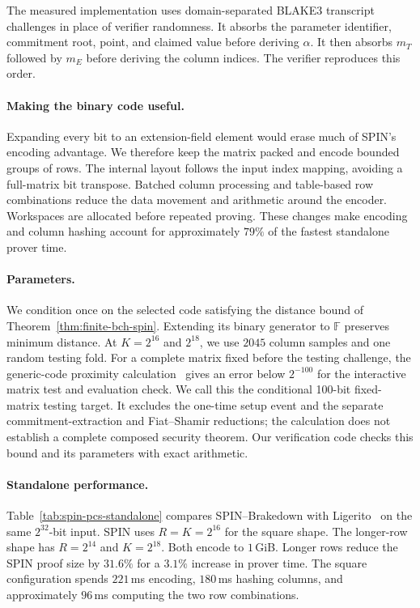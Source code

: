 The measured implementation uses domain-separated BLAKE3 transcript
challenges in place of verifier randomness. It absorbs the parameter
identifier, commitment root, point, and claimed value before deriving
$\alpha$. It then absorbs $m_T$ followed by $m_E$ before deriving the
column indices. The verifier reproduces this order.

\paragraph{Making the binary code useful.}
Expanding every bit to an extension-field element would erase much of
SPIN's encoding advantage. We therefore keep the matrix packed and
encode bounded groups of rows. The internal layout follows the input
index mapping, avoiding a full-matrix bit transpose. Batched column
processing and table-based row combinations reduce the data movement
and arithmetic around the encoder. Workspaces are allocated before
repeated proving. These changes make encoding and column hashing account
for approximately $79\%$ of the fastest standalone prover time.

\paragraph{Parameters.}
We condition once on the selected code satisfying the distance bound
of Theorem~\ref{thm:finite-bch-spin}. Extending its binary generator to
$\mathbb F$ preserves minimum distance. At $K=2^{16}$ and $2^{18}$,
we use $2045$ column samples and one random testing fold. For a complete
matrix fixed before the testing challenge, the generic-code proximity
calculation~\cite{diamondPosen24} gives an error below $2^{-100}$ for the
interactive matrix test and evaluation check. We call this
the conditional 100-bit fixed-matrix testing target. It excludes the one-time setup
event and the separate commitment-extraction and Fiat--Shamir reductions;
the calculation does not establish a complete composed security theorem.
Our verification code checks this bound and its parameters with exact arithmetic.

\paragraph{Standalone performance.}
Table~\ref{tab:spin-pcs-standalone} compares SPIN--Brakedown with
Ligerito~\cite{ligerito25} on the same $2^{32}$-bit input. SPIN uses
$R=K=2^{16}$ for the square shape. The longer-row shape has $R=2^{14}$
and $K=2^{18}$. Both encode to $1$\,GiB.
Longer rows reduce the SPIN proof
size by $31.6\%$ for a $3.1\%$ increase in prover time. The square
configuration spends $221$\,ms encoding, $180$\,ms hashing columns,
and approximately $96$\,ms computing the two row combinations.

